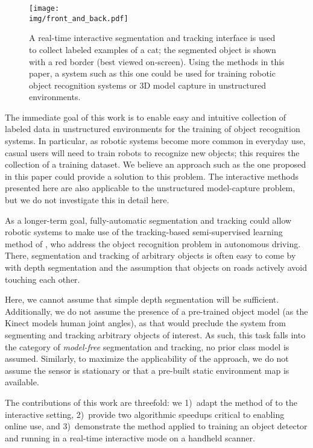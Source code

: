 \documentclass[conference]{IEEEtran}
\newcommand{\img}{img}
\begin{document}
\begin{figure}
  \centering
  \texttt{[image: \\img/front\_and\_back.pdf]}
  \caption{A real-time interactive segmentation and tracking interface is used to collect labeled examples of a cat; the segmented object is shown with a red border (best viewed on-screen).  Using the methods in this paper, a system such as this one could be used for training robotic object recognition systems or 3D model capture in unstructured environments.}
  \label{fig:tricorder}
\end{figure}


The immediate goal of this work is to enable easy and intuitive collection of labeled data in unstructured environments for the training of object recognition systems.  In particular, as robotic systems become more common in everyday use, casual users will need to train robots to recognize new objects; this requires the collection of a training dataset.  We believe an approach such as the one proposed in this paper could provide a solution to this problem.  The interactive methods presented here are also applicable to the unstructured model-capture problem, but we do not investigate this in detail here.

As a longer-term goal, fully-automatic segmentation and tracking could allow robotic systems to make use of the tracking-based semi-supervised learning method of \citet{teichman2011b}, who address the object recognition problem in autonomous driving.  There, segmentation and tracking of arbitrary objects is often easy to come by with depth segmentation and the assumption that objects on roads actively avoid touching each other.

  Here, we cannot assume that simple depth segmentation will be sufficient.  Additionally, we do not assume the presence of a pre-trained object model (\ie as the Kinect models human joint angles), as that would preclude the system from segmenting and tracking arbitrary objects of interest.  As such, this task falls into the category of \emph{model-free} segmentation and tracking, \ie no prior class model is assumed.  Similarly, to maximize the applicability of the approach, we do not assume the sensor is stationary or that a pre-built static environment map is available.

The contributions of this work are threefold: we 1)~adapt the method of \cite{teichman2012a} to the interactive setting, 2)~provide two algorithmic speedups critical to enabling online use, and 3)~demonstrate the method applied to training an object detector and running in a real-time interactive mode on a handheld scanner.
\end{document}
